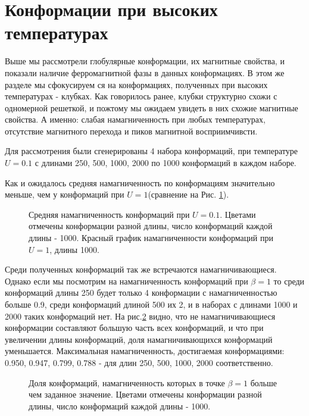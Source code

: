 \section{Конформации при высоких температурах}
Выше мы рассмотрели глобулярные конформации, их магнитные свойства, и показали наличие ферромагнитной фазы в данных конформациях. В этом же разделе мы сфокусируем ся на конформациях, полученных при высоких температурах - клубках. Как говорилось ранее, клубки структурно схожи с одномерной решеткой, и пожтому мы ожидаем увидеть в них схожие магнитные свойства. А именно: слабая намагниченность при любых температурах, отсутствие магнитного перехода и пиков магнитной восприимчивсти.

Для рассмотрения были сгенерированы 4 набора конформаций, при температуре $U=0.1$ с длинами 250, 500, 1000, 2000 по 1000 конформаций в каждом наборе. 

Как и ожидалось средняя намагниченность по конформациям значительно меньше, чем у конформаций при $U = 1$(сравнение на Рис. \ref{fig:U0.1_mean_mag2}).

\begin{figure}[htb]
	\centering
	

	\caption{Средняя намагниченность конформаций при $U=0.1$. Цветами отмечены конформации разной длины, число конформаций каждой длины - 1000. Красный график намагниченности конформаций при $U=1$, длины 1000.}
	\label{fig:U0.1_mean_mag2}
\end{figure}

Среди полученных конформаций так же встречаются намагничивающиеся. Однако если мы посмотрим на намагниченность конформаций при $\beta = 1$ то среди конформаций длины 250 будет только 4 конформации с намагниченностью больше 0.9, среди конформаций длиной 500 их 2, и в наборах с длинами 1000 и 2000 таких конформаций нет. На рис.\ref{fig:fraction_magnetization} видно, что не намагничивающиеся конформации составляют большую часть всех конформаций, и что при увеличении длины конформаций, доля намагничивающихся конформаций уменьшается. Максимальная намагниченность, достигаемая конформациями: 0.950, 0.947, 0.799, 0.788 - для длин 250, 500, 1000, 2000 соответственно.

\begin{figure}[htb]
	\centering
	
	\caption{Доля конформаций, намагниченность которых в точке $\beta = 1$ больше чем заданное значение. Цветами отмечены конформации разной длины, число конформаций каждой длины - 1000.}
	\label{fig:fraction_magnetization}
\end{figure}

